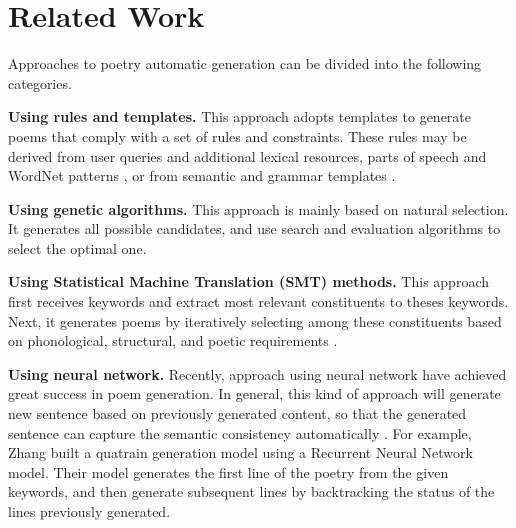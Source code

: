 \section{Related Work}   
Approaches to poetry automatic generation can be divided into the following categories.

\textbf{Using rules and templates.}
%
This approach adopts templates to generate poems that comply with a set of rules and constraints.
%
These rules may be derived from user queries and additional lexical resources\cite{wu2009new,tosa2008hitch},  parts of speech and WordNet patterns \cite{netzer2009gaiku},  or from semantic and grammar templates \cite{oliveira2012poetryme}. 

\textbf {Using genetic algorithms.} This approach is mainly based on natural selection. It generates all possible candidates, and use search and evaluation algorithms to select the optimal one\cite{manurung2004evolutionary,manurung2012using}.
%

\textbf{Using Statistical Machine Translation (SMT) methods.}
 This approach first receives keywords and extract most relevant constituents to theses keywords.  Next, it generates poems by iteratively selecting among these constituents based on phonological, structural, and poetic requirements \cite{jiang2008generating}. 

\textbf{Using neural network.}  Recently, approach using neural network have achieved great success in poem generation.
%
In general, this kind of approach will generate new sentence based on previously generated content, so that the generated sentence can capture the semantic consistency automatically \cite{wang2016chinese,bahdanau2014neural}.
%
For example, Zhang \etal built a quatrain generation model using a Recurrent Neural Network model.  Their model generates the first line of the poetry from the given keywords, and then generate subsequent lines by backtracking the status of the lines previously generated.
% 